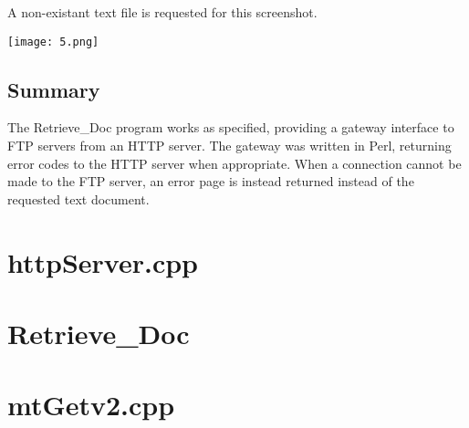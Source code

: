 \documentclass[11pt]{report}
\begin{document}
A non-existant text file is requested for this screenshot.

\begin{center}
\texttt{[image: 5.png]}
\end{center}

\section{Summary}

The Retrieve\_Doc program works as specified, providing a gateway interface to FTP servers from an HTTP server. The gateway was written in Perl, returning error codes to the HTTP server when appropriate. When a connection cannot be made to the FTP server, an error page is instead returned instead of the requested text document.

\appendix

\chapter{httpServer.cpp}


\chapter{Retrieve\_Doc}


\chapter{mtGetv2.cpp}

\end{document}
